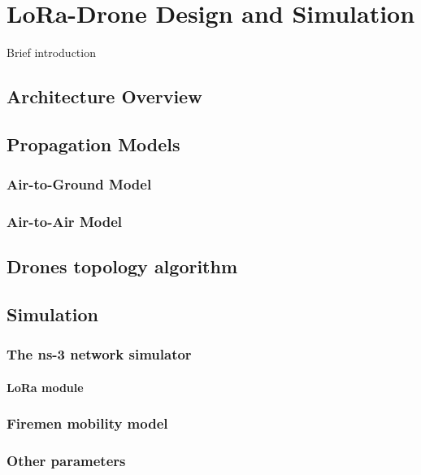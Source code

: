 
\chapter{LoRa-Drone Design and Simulation}
\label{chapter:loradronesim}

Brief introduction

\section{Architecture Overview}

\section{Propagation Models}

\subsection{Air-to-Ground Model}

\subsection{Air-to-Air Model}

\section{Drones topology algorithm}

\section{Simulation}

\subsection{The ns-3 network simulator}

\subsubsection{LoRa module}

\subsection{Firemen mobility model}

\subsection{Other parameters}